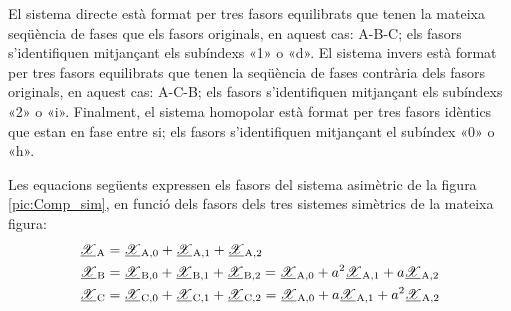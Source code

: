 \begin{center}
    
    \label{pic:Comp_sim}
\end{center}

 
 El sistema directe està format per tres
fasors equilibrats que tenen la mateixa seqüència de fases que els fasors
originals, en aquest cas: A-B-C; els fasors
s'identifiquen mitjançant els subíndexs «1» o «d». El sistema
invers està format per tres fasors equilibrats que tenen la seqüència de fases contrària
 dels fasors originals, en aquest cas: A-C-B; els fasors s'identifiquen mitjançant els
subíndexs «2» o «i». Finalment, el sistema homopolar està
format per tres fasors idèntics que estan en fase entre si; els fasors 
s'identifiquen mitjançant el subíndex «0» o «h».

Les equacions següents expressen els fasors del sistema asimètric de la figura \vref{pic:Comp_sim}, en funció
dels fasors dels tres sistemes simètrics de la mateixa figura:
\begin{subequations}
\begin{align}
   \cmplx{\mathscr{X}}\ped{A} &= \cmplx{\mathscr{X}}\ped{A,0}  +
   \cmplx{\mathscr{X}}\ped{A,1} + \cmplx{\mathscr{X}}\ped{A,2} \label{eq:c_sim_a}\\
   \cmplx{\mathscr{X}}\ped{B} &= \cmplx{\mathscr{X}}\ped{B,0} + \cmplx{\mathscr{X}}\ped{B,1} +
   \cmplx{\mathscr{X}}\ped{B,2}  =  \cmplx{\mathscr{X}}\ped{A,0} + a^2
   \cmplx{\mathscr{X}}\ped{A,1} + a \cmplx{\mathscr{X}}\ped{A,2} \label{eq:c_sim_b}\\
   \cmplx{\mathscr{X}}\ped{C} &= \cmplx{\mathscr{X}}\ped{C,0} + \cmplx{\mathscr{X}}\ped{C,1} +
   \cmplx{\mathscr{X}}\ped{C,2}  = \cmplx{\mathscr{X}}\ped{A,0} + a
   \cmplx{\mathscr{X}}\ped{A,1} + a^2 \cmplx{\mathscr{X}}\ped{A,2} \label{eq:c_sim_c}
\end{align}
\end{subequations}

